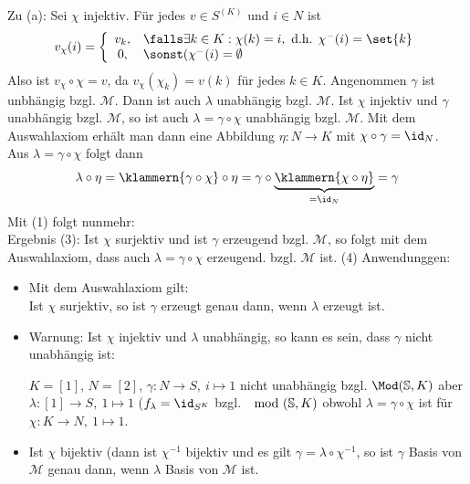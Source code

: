 Zu (a): Sei $\chi$ injektiv.
Für jedes $v\in S^{(K)}$ und $i\in N$ ist
\begin{align*}
	v_\chi(i)=\left\lbrace\begin{array}{cl}
		v_k, &\falls \exists k\in K:\chi(k)=i,\text{ d.h. }\chi^{-}(i)=\set{k}\\
		0, &\sonst (\chi^{-}(i)=\emptyset
	\end{array}\right.
\end{align*}
Also ist $v_\chi\circ\chi=v$, da $v_\chi(\chi_k)=v(k)$ für jedes $k\in K$.
Angenommen $\gamma$ ist unbhängig bzgl. $\mathcal{M}$.
Dann ist auch $\lambda$ unabhängig bzgl. $\mathcal{M}$.\nl
{} Ist $\chi$ injektiv und $\gamma$ unabhängig bzgl. $\mathcal{M}$, so ist auch $\lambda=\gamma\circ\chi$ unabhängig bzgl. $\mathcal{M}$.\nl
{} Mit dem Auswahlaxiom erhält man dann eine Abbildung $\eta\colon N\to K$ mit $\chi\circ\gamma=\id_N$.\\
 Aus $\lambda=\gamma\circ\chi$ folgt dann
\begin{align*}
	\lambda\circ\eta
	=\klammern{\gamma\circ\chi}\circ\eta
	=\gamma\circ\underbrace{\klammern{\chi\circ\eta}}_{=\id_N}=\gamma
\end{align*}
Mit (1) folgt nunmehr:\\
Ergebnis (3): Ist $\chi$ surjektiv und ist $\gamma$ erzeugend bzgl. $\mathcal{M}$, so folgt mit dem Auswahlaxiom, dass auch 
$\lambda=\gamma\circ\chi$ erzeugend. bzgl. $\mathcal{M}$ ist.\nl
(4) Anwendunggen:
\begin{itemize}
	\item Mit dem Auswahlaxiom gilt:\\
Ist $\chi$ surjektiv, so ist $\gamma$ erzeugt genau dann, wenn $\lambda$ erzeugt ist.
	\item Warnung: Ist $\chi$ injektiv und $\lambda$ unabhängig, so kann es sein, dass $\gamma$ nicht unabhängig ist:
\begin{beispiel}
	$K=[1]$, $N=[2]$, $\gamma\colon N\to S,~i\mapsto 1$ nicht unabhängig bzgl. $\Mod(\S,K)$ aber $\lambda\colon[1]\to S,~1\mapsto 1$ ($f_\lambda=\id_{S^K}$ bzgl. $\mod(\S,K)$ obwohl $\lambda=\gamma\circ\chi$ ist für $\chi\colon K\to N,~1\mapsto 1$.
	\end{beispiel}
	\item Ist $\chi$ bijektiv (dann ist $\chi^{-1}$ bijektiv und es gilt $\gamma=\lambda\circ\chi^{-1}$, so ist $\gamma$ Basis von $\mathcal{M}$ genau dann, wenn $\lambda$ Basis von $\mathcal{M}$ ist.
\end{itemize}



